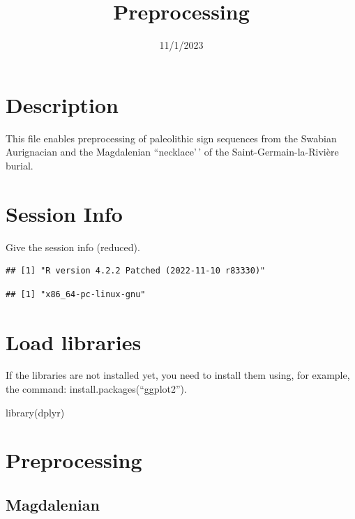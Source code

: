 \documentclass[
]{article}
\title{Preprocessing}
\author{}
\date{\vspace{-2.5em}11/1/2023}
\newenvironment{Shaded}{\begin{snugshade}}{\end{snugshade}}
\newcommand{\FunctionTok}[1]{\textcolor[rgb]{0.00,0.00,0.00}{#1}}
\newcommand{\NormalTok}[1]{#1}
\begin{document}
\maketitle

\hypertarget{description}{%
\section{Description}\label{description}}

This file enables preprocessing of paleolithic sign sequences from the
Swabian Aurignacian and the Magdalenian ``necklace'\,' of the
Saint-Germain-la-Rivière burial.

\hypertarget{session-info}{%
\section{Session Info}\label{session-info}}

Give the session info (reduced).

\begin{verbatim}
## [1] "R version 4.2.2 Patched (2022-11-10 r83330)"
\end{verbatim}

\begin{verbatim}
## [1] "x86_64-pc-linux-gnu"
\end{verbatim}

\hypertarget{load-libraries}{%
\section{Load libraries}\label{load-libraries}}

If the libraries are not installed yet, you need to install them using,
for example, the command: install.packages(``ggplot2'').

\begin{Shaded}
\begin{Highlighting}[]
\FunctionTok{library}\NormalTok{(dplyr)}
\end{Highlighting}
\end{Shaded}

\hypertarget{preprocessing}{%
\section{Preprocessing}\label{preprocessing}}

\hypertarget{magdalenian}{%
\subsection{Magdalenian}\label{magdalenian}}
\end{document}
